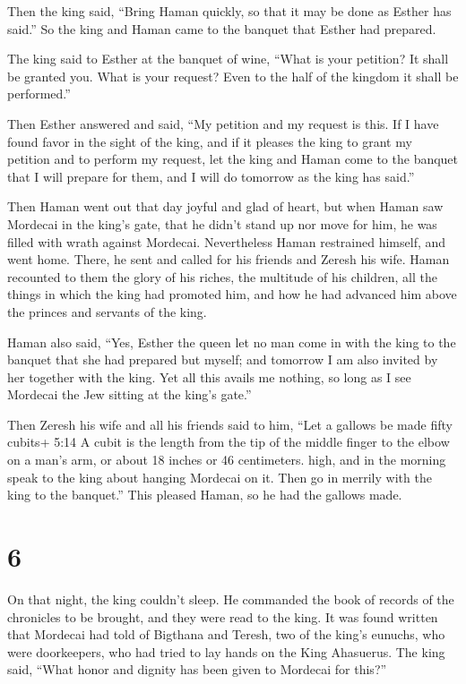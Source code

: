  Then the king said, ``Bring Haman quickly, so that it may
be done as Esther has said.'' So the king and Haman came to the banquet
that Esther had prepared.

 The king said to Esther at the banquet of wine, ``What is
your petition? It shall be granted you. What is your request? Even to
the half of the kingdom it shall be performed.''

 Then Esther answered and said, ``My petition and my request
is this.  If I have found favor in the sight of the king,
and if it pleases the king to grant my petition and to perform my
request, let the king and Haman come to the banquet that I will prepare
for them, and I will do tomorrow as the king has said.''

 Then Haman went out that day joyful and glad of heart, but
when Haman saw Mordecai in the king's gate, that he didn't stand up nor
move for him, he was filled with wrath against Mordecai. 
Nevertheless Haman restrained himself, and went home. There, he sent and
called for his friends and Zeresh his wife.  Haman
recounted to them the glory of his riches, the multitude of his
children, all the things in which the king had promoted him, and how he
had advanced him above the princes and servants of the king.

 Haman also said, ``Yes, Esther the queen let no man come
in with the king to the banquet that she had prepared but myself; and
tomorrow I am also invited by her together with the king. 
Yet all this avails me nothing, so long as I see Mordecai the Jew
sitting at the king's gate.''

 Then Zeresh his wife and all his friends said to him,
``Let a gallows be made fifty cubits+ 5:14 A cubit is the length from
the tip of the middle finger to the elbow on a man's arm, or about 18
inches or 46 centimeters. high, and in the morning speak to the king
about hanging Mordecai on it. Then go in merrily with the king to the
banquet.'' This pleased Haman, so he had the gallows made.

\hypertarget{section-5}{%
\section{6}\label{section-5}}

 On that night, the king couldn't sleep. He commanded the
book of records of the chronicles to be brought, and they were read to
the king.  It was found written that Mordecai had told of
Bigthana and Teresh, two of the king's eunuchs, who were doorkeepers,
who had tried to lay hands on the King Ahasuerus.  The king
said, ``What honor and dignity has been given to Mordecai for this?''


